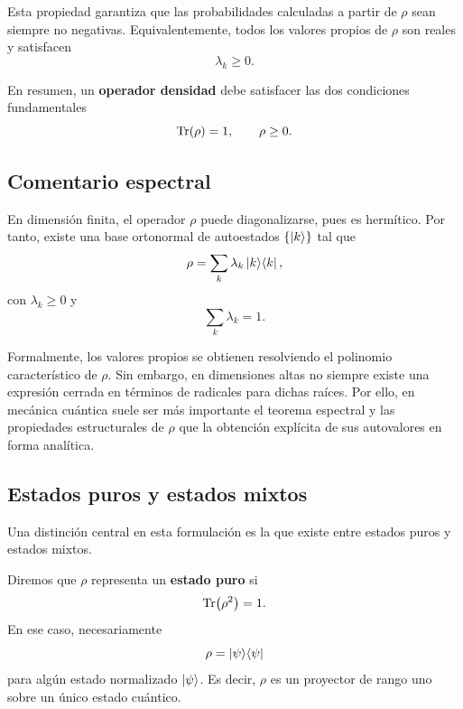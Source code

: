\documentclass[../main.tex]{subfiles}
\begin{document}
Esta propiedad garantiza que las probabilidades calculadas a partir de $\rho$ sean siempre no negativas. Equivalentemente, todos los valores propios de $\rho$ son reales y satisfacen
\begin{equation*}
    \lambda_k \geq 0.
\end{equation*}

En resumen, un \textbf{operador densidad} debe satisfacer las dos condiciones fundamentales
\begin{equation*}
    \Tr(\rho)=1,
    \qquad
    \rho\geq 0.
\end{equation*}

\subsection*{Comentario espectral}

En dimensión finita, el operador $\rho$ puede diagonalizarse, pues es hermítico. Por tanto, existe una base ortonormal de autoestados $\{\ket{k}\}$ tal que
\begin{equation*}
    \rho = \sum_k \lambda_k \ket{k}\!\bra{k},
\end{equation*}
con $\lambda_k\geq 0$ y
\begin{equation*}
    \sum_k \lambda_k = 1.
\end{equation*}

Formalmente, los valores propios se obtienen resolviendo el polinomio característico de $\rho$. Sin embargo, en dimensiones altas no siempre existe una expresión cerrada en términos de radicales para dichas raíces. Por ello, en mecánica cuántica suele ser más importante el teorema espectral y las propiedades estructurales de $\rho$ que la obtención explícita de sus autovalores en forma analítica.

\subsection*{Estados puros y estados mixtos}

Una distinción central en esta formulación es la que existe entre estados puros y estados mixtos.

Diremos que $\rho$ representa un \textbf{estado puro} si
\begin{equation*}
    \Tr(\rho^2)=1.
\end{equation*}
En ese caso, necesariamente
\begin{equation*}
    \rho = \ket{\psi}\!\bra{\psi}
\end{equation*}
para algún estado normalizado $\ket{\psi}$. Es decir, $\rho$ es un proyector de rango uno sobre un único estado cuántico.
\end{document}
